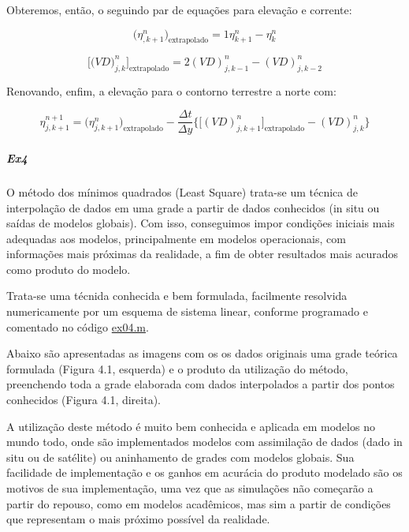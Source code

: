 \documentclass[11pt]{article}
\begin{document}
Obteremos, então, o seguindo par de equações para elevação e corrente:

\begin{equation}
    \bigg( \eta^{n}_{,k+1} \bigg)_{\text{extrapolado}} = 1\eta^{n}_{k+1} - \eta^{n}_k
    \label{ex3B:eq7}
\end{equation}

\begin{equation}
    \bigg[ \bigg( VD \bigg)^{n}_{j,k} \bigg]_{\text{extrapolado}} = 2(VD)^{n}_{j,k-1} - (VD)^{n}_{j,k-2}
    \label{ex3B:eq8}
\end{equation}
\bigskip

Renovando, enfim, a elevação para o contorno terrestre a norte com:

\begin{equation}
    \eta^{n+1}_{j,k+1} = \bigg( \eta^{n}_{j,k+1} \bigg)_{\text{extrapolado}} - \frac{\Delta{t}}{\Delta{y}}\bigg\{ \bigg[ (VD)^{n}_{j,k+1} \bigg]_{\text{extrapolado}} -(VD)^{n}_{j,k} \bigg\}
    \label{ex3B:eq9}
\end{equation}

    \subparagraph{Ex4}\label{ex4}

O método dos mínimos quadrados (Least Square) trata-se um técnica de
interpolação de dados em uma grade a partir de dados conhecidos (in situ
ou saídas de modelos globais). Com isso, conseguimos impor condições
iniciais mais adequadas aos modelos, principalmente em modelos
operacionais, com informações mais próximas da realidade, a fim de obter
resultados mais acurados como produto do modelo.

Trata-se uma técnida conhecida e bem formulada, facilmente resolvida
numericamente por um esquema de sistema linear, conforme programado e
comentado no código \href{../codes/ex04.m}{ex04.m}.

Abaixo são apresentadas as imagens com os os dados originais uma grade
teórica formulada (Figura 4.1, esquerda) e o produto da utilização do
método, preenchendo toda a grade elaborada com dados interpolados a
partir dos pontos conhecidos (Figura 4.1, direita).

A utilização deste método é muito bem conhecida e aplicada em modelos no
mundo todo, onde são implementados modelos com assimilação de dados
(dado in situ ou de satélite) ou aninhamento de grades com modelos
globais. Sua facilidade de implementação e os ganhos em acurácia do
produto modelado são os motivos de sua implementação, uma vez que as
simulações não começarão a partir do repouso, como em modelos
acadêmicos, mas sim a partir de condições que representam o mais próximo
possível da realidade.
\end{document}
